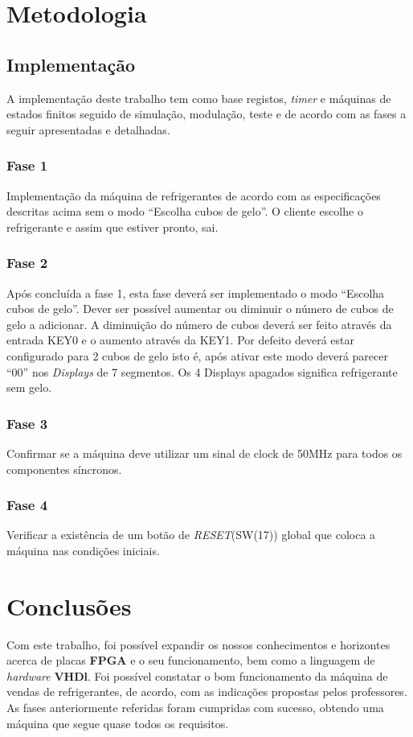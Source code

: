 \documentclass{report}
\begin{document}
\chapter{Metodologia}
\label{chap.metodologia}
\section{Implementação}
A implementação deste trabalho tem como base registos, \textit{timer} e máquinas de estados finitos \cite{ericmccreath2008} seguido de simulação, modulação, teste e de acordo com as fases a seguir apresentadas e detalhadas.

\subsection{Fase 1}
Implementação da máquina de refrigerantes de acordo com as especificações descritas acima sem o modo “Escolha cubos de gelo”. O cliente escolhe o refrigerante e assim que estiver pronto, sai.

\subsection{Fase 2}
Após concluída a fase 1, esta fase deverá ser implementado o modo “Escolha cubos de gelo”. Dever ser possível aumentar ou diminuir o número de cubos de gelo a adicionar. A diminuição do número de cubos deverá ser feito através da entrada KEY0 e o aumento através da KEY1. Por defeito deverá estar configurado para 2 cubos de gelo isto é, após ativar este modo deverá parecer “00” nos \textit{Displays} de 7 segmentos. Os 4 Displays apagados significa refrigerante sem gelo.

\subsection{Fase 3}
Confirmar se a máquina deve utilizar um sinal de clock de 50MHz para todos os componentes síncronos.

\subsection{Fase 4}
Verificar a existência de um botão de \textit{RESET}(SW(17)) global que coloca a máquina nas condições iniciais.

\chapter{Conclusões}
\label{chap.conclusao}
Com este trabalho, foi possível expandir os nossos conhecimentos e horizontes acerca de placas \textbf{FPGA} e o seu funcionamento, bem como a linguagem de \textit{hardware} \textbf{VHDl}. Foi possível constatar o bom funcionamento da máquina de vendas de refrigerantes, de acordo, com as indicações propostas pelos professores. As fases anteriormente referidas foram cumpridas com sucesso, obtendo uma máquina que segue quase todos os requisitos.
\end{document}
